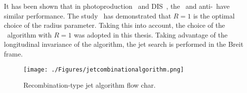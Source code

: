  It has been shown that in photoproduction~\cite{pub:incljetphp} and DIS~\cite{pub:claudia}, the \kt~and anti-\kt~have similar performance. The study~\cite{pub:jetradius} has demonstrated that $R=1$ is the optimal choice of the radius parameter. Taking this into account, the choice of the \kt~algorithm with $R=1$ was adopted in this thesis. Taking advantage of the longitudinal invariance of the algorithm, the jet search is performed in the Breit frame.

\begin{figure}
	\centering
		\texttt{[image: ./Figures/jetcombinationalgorithm.png]}
	\caption{Recombination-type jet algorithm flow char.}
	\label{fig:jetcombinationalgorithm}
\end{figure}
